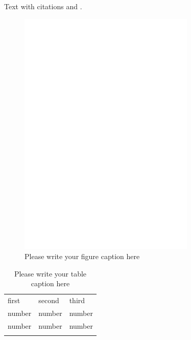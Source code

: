 Text with citations \cite{RefB} and \cite{RefJ}.

%
\begin{figure}
  \includegraphics[width=0.75\textwidth]{bfeed_mob}
\caption{Please write your figure caption here}
\label{fig:2}       %
\end{figure}
%
\begin{table}
\caption{Please write your table caption here}
\label{tab:1}       %
\begin{tabular}{lll}
\hline\noalign{\smallskip}
first & second & third  \\
\noalign{\smallskip}\hline\noalign{\smallskip}
number & number & number \\
number & number & number \\
\noalign{\smallskip}\hline
\end{tabular}
\end{table}



